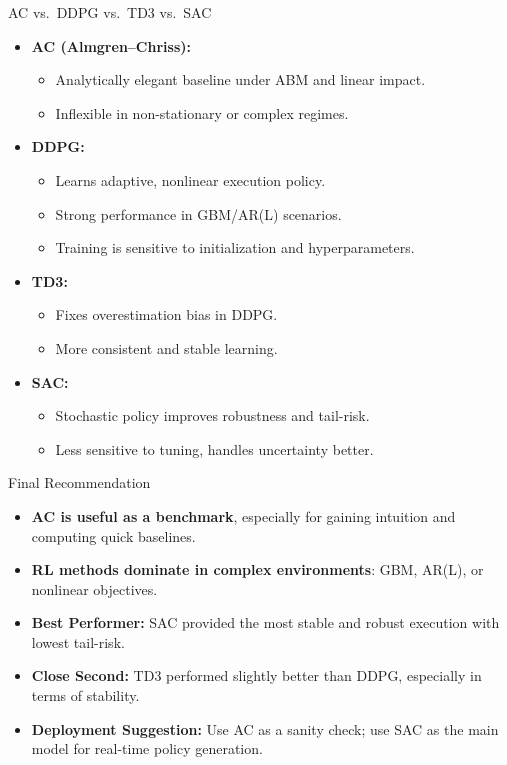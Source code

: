 \documentclass[11pt,aspectratio=169]{beamer}   %
\begin{document}
\begin{frame}{AC vs.\ DDPG vs.\ TD3 vs.\ SAC}
	\begin{itemize}
		\item \textbf{AC (Almgren–Chriss):}
		\begin{itemize}
			\item Analytically elegant baseline under ABM and linear impact.
			\item Inflexible in non-stationary or complex regimes.
		\end{itemize}
		
		\item \textbf{DDPG:}
		\begin{itemize}
			\item Learns adaptive, nonlinear execution policy.
			\item Strong performance in GBM/AR(L) scenarios.
			\item Training is sensitive to initialization and hyperparameters.
		\end{itemize}
		
		\item \textbf{TD3:}
		\begin{itemize}
			\item Fixes overestimation bias in DDPG.
			\item More consistent and stable learning.
		\end{itemize}
		
		\item \textbf{SAC:}
		\begin{itemize}
			\item Stochastic policy improves robustness and tail-risk.
			\item Less sensitive to tuning, handles uncertainty better.
		\end{itemize}
	\end{itemize}
\end{frame}
\begin{frame}{Final Recommendation}
	\begin{itemize}
		\item \textbf{AC is useful as a benchmark}, especially for gaining intuition and computing quick baselines.
		\item \textbf{RL methods dominate in complex environments}: GBM, AR(L), or nonlinear objectives.
		\item \textbf{Best Performer:} SAC provided the most stable and robust execution with lowest tail-risk.
		\item \textbf{Close Second:} TD3 performed slightly better than DDPG, especially in terms of stability.
		\item \textbf{Deployment Suggestion:} Use AC as a sanity check; use SAC as the main model for real-time policy generation.
	\end{itemize}
\end{frame}
\end{document}

